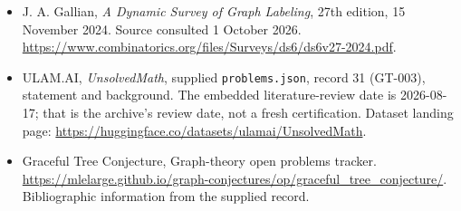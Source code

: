 \documentclass[11pt,a4paper]{article}
\begin{document}
{\small

\begin{itemize}
\item[E1] J. A. Gallian, \emph{A Dynamic Survey of Graph Labeling}, 27th edition, 15 November 2024. Source consulted 1 October 2026. \url{https://www.combinatorics.org/files/Surveys/ds6/ds6v27-2024.pdf}.


\item[\hypertarget{source:31:1}{S1}] ULAM.AI, \emph{UnsolvedMath}, supplied \texttt{problems.json}, record 31 (GT-003), statement and background. The embedded literature-review date is 2026-08-17; that is the archive’s review date, not a fresh certification. Dataset landing page: \url{https://huggingface.co/datasets/ulamai/UnsolvedMath}.

\item[\hypertarget{source:31:2}{S2}] Graceful Tree Conjecture, Graph-theory open problems tracker. \url{https://mlelarge.github.io/graph-conjectures/op/graceful_tree_conjecture/}. Bibliographic information from the supplied record.

\end{itemize}

}

\label{end:31}
\end{document}
